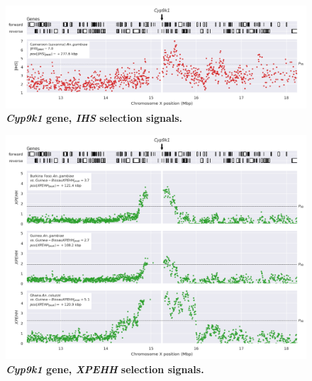 \documentclass[a4paper,11pt,abstracton,hidelinks]{scrartcl}
\begin{document}
\begin{figure}[t!]
	\begin{center}
		\includegraphics*[width=1\linewidth,center]{artwork/locus_cyp9k1_ihs_pdist.png}
	\end{center}
	\caption[\textit{Cyp9k1} gene, \textit{IHS} selection signals]{
	\textbf{\textit{Cyp9k1} gene, \textit{IHS} selection signals.}
	} 
	\label{fig:locus_cyp9k1_ihs}
\end{figure}


\clearpage


\begin{figure}[t!]
	\begin{center}
		\includegraphics*[width=1\linewidth,center]{artwork/locus_cyp9k1_xpehh_pdist.png}
	\end{center}
	\caption[\textit{Cyp9k1} gene, \textit{XPEHH} selection signals]{
	\textbf{\textit{Cyp9k1} gene, \textit{XPEHH} selection signals.}
	} 
	\label{fig:locus_cyp9k1_xpehh}
\end{figure}


%
%
\end{document}
